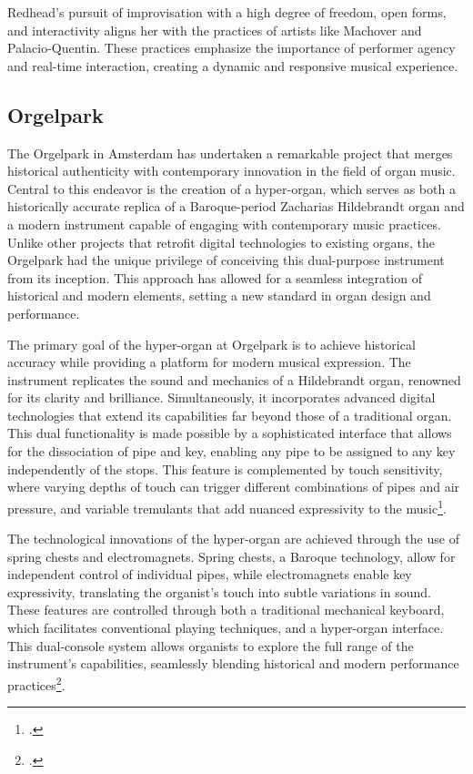 \documentclass[12pt,twoside,maitrise]{dms_ks}
\theoremstyle{definition}
\begin{document}
Redhead’s pursuit of improvisation with a high degree of freedom, open forms, and interactivity aligns her with the practices of artists like Machover and Palacio-Quentin. These practices emphasize the importance of performer agency and real-time interaction, creating a dynamic and responsive musical experience.

\subsection{Orgelpark}

The Orgelpark in Amsterdam has undertaken a remarkable project that merges historical authenticity with contemporary innovation in the field of organ music. 
Central to this endeavor is the creation of a hyper-organ, which serves as both a historically accurate replica of a Baroque-period Zacharias Hildebrandt organ and a modern instrument capable of engaging with contemporary music practices. 
Unlike other projects that retrofit digital technologies to existing organs, the Orgelpark had the unique privilege of conceiving this dual-purpose instrument from its inception. 
This approach has allowed for a seamless integration of historical and modern elements, setting a new standard in organ design and performance.

The primary goal of the hyper-organ at Orgelpark is to achieve historical accuracy while providing a platform for modern musical expression. 
The instrument replicates the sound and mechanics of a Hildebrandt organ, renowned for its clarity and brilliance. 
Simultaneously, it incorporates advanced digital technologies that extend its capabilities far beyond those of a traditional organ. 
This dual functionality is made possible by a sophisticated interface that allows for the dissociation of pipe and key, enabling any pipe to be assigned to any key independently of the stops. 
This feature is complemented by touch sensitivity, where varying depths of touch can trigger different combinations of pipes and air pressure, and variable tremulants that add nuanced expressivity to the music\footcite{fidom_digital_2014}.

The technological innovations of the hyper-organ are achieved through the use of spring chests and electromagnets. 
Spring chests, a Baroque technology, allow for independent control of individual pipes, while electromagnets enable key expressivity, translating the organist's touch into subtle variations in sound. 
These features are controlled through both a traditional mechanical keyboard, which facilitates conventional playing techniques, and a hyper-organ interface. 
This dual-console system allows organists to explore the full range of the instrument's capabilities, seamlessly blending historical and modern performance practices\footcite{peters_how_2014}.
\end{document}
